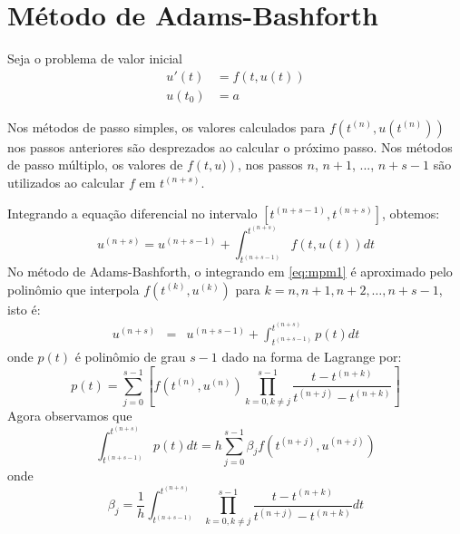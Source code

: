 \construirExer

\section{Método de Adams-Bashforth}\label{sec:Adams_Bashforth}
Seja o problema de valor inicial
\begin{eqnarray}
  u'(t) &= f(t,u(t)) \\
  u(t_0) &= a
\end{eqnarray}

Nos métodos de passo simples, os valores calculados para $f\left(t^{(n)},u(t^{(n)})\right)$ nos passos anteriores são desprezados ao calcular o próximo passo. Nos métodos de passo múltiplo, os valores de $f\left(t,u)\right)$, nos passos $n$, $n+1$, ..., $n+s-1$ são utilizados ao calcular $f$ em $t^{(n+s)}$.

Integrando a equação diferencial no intervalo $[t^{(n+s-1)},t^{(n+s)}]$, obtemos:
\begin{equation}\label{eq:mpm1}
  u^{(n+s)}  = u^{(n+s-1)}  + \int_{t^{(n+s-1)}}^{t^{(n+s)}} f(t,u(t)) dt
\end{equation}
No método de Adams-Bashforth, o integrando em \eqref{eq:mpm1} é aproximado pelo polinômio que interpola $f(t^{(k)},u^{(k)})$ para $k = n, n+1, n+2, \ldots, n+s-1$, isto é:
\begin{eqnarray}%
  u^{(n+s)}  &=& u^{(n+s-1)}  + \int_{t^{(n+s-1)}}^{t^{(n+s)}} p(t) dt
\end{eqnarray}
onde $p(t)$ é polinômio de grau $s-1$ dado na forma de Lagrange por:
\begin{equation} p(t)=\sum_{j=0}^{s-1}\left[f(t^{(n)},u^{(n)}) \prod_{k=0,k\neq j}^{s-1} \frac{t-t^{(n+k)}}{t^{(n+j)}-t^{(n+k)}}\right] \end{equation}
Agora observamos que
\begin{equation} \int _{t^{(n+s-1)}}^{t^{(n+s)}} p(t) dt=h\sum_{j=0}^{s-1}\beta_j f(t^{(n+j)},u^{(n+j)}) \end{equation}
onde
\begin{equation}\label{eq:betaj}
\beta_j= \frac{1}{h}\int_{t^{(n+s-1)}}^{t^{(n+s)}} \prod_{k=0,k\neq j}^{s-1} \frac{t-t^{(n+k)}}{t^{(n+j)}-t^{(n+k)}}dt
\end{equation}

